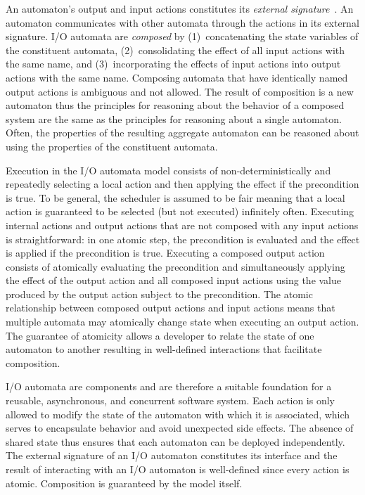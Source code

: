 An automaton's output and input actions constitutes its \emph{external signature}~\cite{lynch1996distributed}.
An automaton communicates with other automata through the actions in its external signature.
I/O automata are \emph{composed} by (1)~concatenating the state variables of the constituent automata, (2)~consolidating the effect of all input actions with the same name, and (3)~incorporating the effects of input actions into output actions with the same name.
Composing automata that have identically named output actions is ambiguous and not allowed.
The result of composition is a new automaton thus the principles for reasoning about the behavior of a composed system are the same as the principles for reasoning about a single automaton.
Often, the properties of the resulting aggregate automaton can be reasoned about using the properties of the constituent automata.

Execution in the I/O automata model consists of non-deterministically and repeatedly selecting a local action and then applying the effect if the precondition is true.
To be general, the scheduler is assumed to be fair meaning that a local action is guaranteed to be selected (but not executed) infinitely often.
Executing internal actions and output actions that are not composed with any input actions is straightforward: in one atomic step, the precondition is evaluated and the effect is applied if the precondition is true.
Executing a composed output action consists of atomically evaluating the precondition and simultaneously applying the effect of the output action and all composed input actions using the value produced by the output action subject to the precondition.
The atomic relationship between composed output actions and input actions means that multiple automata may atomically change state when executing an output action.
The guarantee of atomicity allows a developer to relate the state of one automaton to another resulting in well-defined interactions that facilitate composition.

I/O automata are components and are therefore a suitable foundation for a reusable, asynchronous, and concurrent software system.
Each action is only allowed to modify the state of the automaton with which it is associated, which serves to encapsulate behavior and avoid unexpected side effects.
The absence of shared state thus ensures that each automaton can be deployed independently.
The external signature of an I/O automaton constitutes its interface and the result of interacting with an I/O automaton is well-defined since every action is atomic.
Composition is guaranteed by the model itself.

